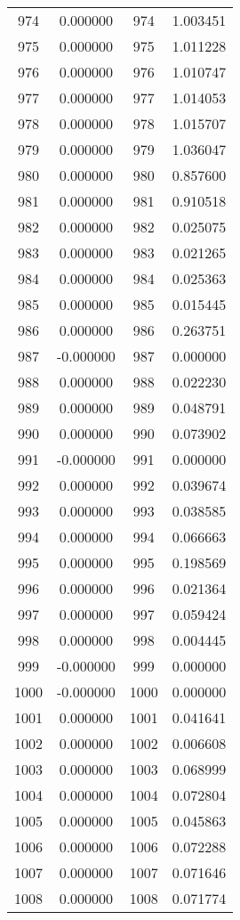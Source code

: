 \documentclass[12pt]{article}
\begin{document}
\begin{longtable}{@{}cccc@{}}
974 & 0.000000 & 974 & 1.003451 \\
975 & 0.000000 & 975 & 1.011228 \\
976 & 0.000000 & 976 & 1.010747 \\
977 & 0.000000 & 977 & 1.014053 \\
978 & 0.000000 & 978 & 1.015707 \\
979 & 0.000000 & 979 & 1.036047 \\
980 & 0.000000 & 980 & 0.857600 \\
981 & 0.000000 & 981 & 0.910518 \\
982 & 0.000000 & 982 & 0.025075 \\
983 & 0.000000 & 983 & 0.021265 \\
984 & 0.000000 & 984 & 0.025363 \\
985 & 0.000000 & 985 & 0.015445 \\
986 & 0.000000 & 986 & 0.263751 \\
987 & -0.000000 & 987 & 0.000000 \\
988 & 0.000000 & 988 & 0.022230 \\
989 & 0.000000 & 989 & 0.048791 \\
990 & 0.000000 & 990 & 0.073902 \\
991 & -0.000000 & 991 & 0.000000 \\
992 & 0.000000 & 992 & 0.039674 \\
993 & 0.000000 & 993 & 0.038585 \\
994 & 0.000000 & 994 & 0.066663 \\
995 & 0.000000 & 995 & 0.198569 \\
996 & 0.000000 & 996 & 0.021364 \\
997 & 0.000000 & 997 & 0.059424 \\
998 & 0.000000 & 998 & 0.004445 \\
999 & -0.000000 & 999 & 0.000000 \\
1000 & -0.000000 & 1000 & 0.000000 \\
1001 & 0.000000 & 1001 & 0.041641 \\
1002 & 0.000000 & 1002 & 0.006608 \\
1003 & 0.000000 & 1003 & 0.068999 \\
1004 & 0.000000 & 1004 & 0.072804 \\
1005 & 0.000000 & 1005 & 0.045863 \\
1006 & 0.000000 & 1006 & 0.072288 \\
1007 & 0.000000 & 1007 & 0.071646 \\
1008 & 0.000000 & 1008 & 0.071774 \\

\end{longtable}
\end{document}
